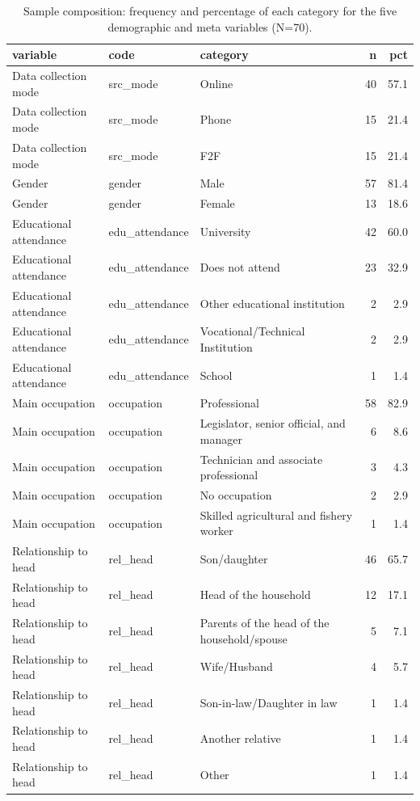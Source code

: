 \begin{table}
\caption{Sample composition: frequency and percentage of each category for the five demographic and meta variables (N=70).}
\label{tab:sample_composition}
\begin{tabular}{lllrr}
\toprule
variable & code & category & n & pct \\
\midrule
Data collection mode & src\_mode & Online & 40 & 57.1 \\
Data collection mode & src\_mode & Phone & 15 & 21.4 \\
Data collection mode & src\_mode & F2F & 15 & 21.4 \\
Gender & gender & Male & 57 & 81.4 \\
Gender & gender & Female & 13 & 18.6 \\
Educational attendance & edu\_attendance & University & 42 & 60.0 \\
Educational attendance & edu\_attendance & Does not attend & 23 & 32.9 \\
Educational attendance & edu\_attendance & Other educational institution & 2 & 2.9 \\
Educational attendance & edu\_attendance & Vocational/Technical Institution & 2 & 2.9 \\
Educational attendance & edu\_attendance & School & 1 & 1.4 \\
Main occupation & occupation & Professional & 58 & 82.9 \\
Main occupation & occupation & Legislator, senior official, and manager & 6 & 8.6 \\
Main occupation & occupation & Technician and associate professional & 3 & 4.3 \\
Main occupation & occupation & No occupation & 2 & 2.9 \\
Main occupation & occupation & Skilled agricultural and fishery worker & 1 & 1.4 \\
Relationship to head & rel\_head & Son/daughter & 46 & 65.7 \\
Relationship to head & rel\_head & Head of the household & 12 & 17.1 \\
Relationship to head & rel\_head & Parents of the head of the household/spouse & 5 & 7.1 \\
Relationship to head & rel\_head & Wife/Husband & 4 & 5.7 \\
Relationship to head & rel\_head & Son-in-law/Daughter in law & 1 & 1.4 \\
Relationship to head & rel\_head & Another relative & 1 & 1.4 \\
Relationship to head & rel\_head & Other & 1 & 1.4 \\
\bottomrule
\end{tabular}
\end{table}
